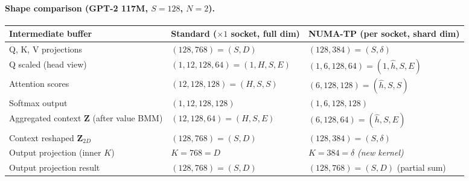 \documentclass{article}
\begin{document}
\paragraph{Shape comparison (GPT-2 117M, $S{=}128$, $N{=}2$).}
\begin{center}
\small
\renewcommand{\arraystretch}{1.12}
\begin{tabular}{@{} l l l @{}}
\toprule
Intermediate buffer & Standard ($\times1$ socket, full dim) & NUMA-TP (per socket, shard dim) \\
\midrule
Q, K, V projections         & $(128,768)=(S,D)$           & $(128,384)=(S,\delta)$          \\
Q scaled (head view)         & $(1,12,128,64)=(1,H,S,E)$  & $(1,6,128,64)=(1,\hat{h},S,E)$ \\
Attention scores             & $(12,128,128)=(H,S,S)$      & $(6,128,128)=(\hat{h},S,S)$    \\
Softmax output               & $(1,12,128,128)$            & $(1,6,128,128)$                \\
Aggregated context $\mathbf{Z}$ (after value BMM) & $(12,128,64)=(H,S,E)$ & $(6,128,64)=(\hat{h},S,E)$ \\
Context reshaped $\mathbf{Z}_{2D}$ & $(128,768)=(S,D)$   & $(128,384)=(S,\delta)$         \\
Output projection (inner $K$)& $K=768=D$                   & $K=384=\delta$ \emph{(new kernel)}\\
Output projection result     & $(128,768)=(S,D)$           & $(128,768)=(S,D)$ (partial sum)\\
\bottomrule
\end{tabular}
\end{center}

\bigskip
\end{document}
